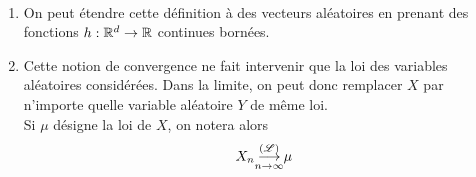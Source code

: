 \begin{remark}\,
    \begin{enumerate}
        \item On peut étendre cette définition à des vecteurs aléatoires
        en prenant des fonctions \(h:\mathbb{R}^d\to\mathbb{R}\) continues bornées.

        \item Cette notion de convergence ne fait intervenir que la loi
        des variables aléatoires considérées. Dans la limite, on peut donc
        remplacer \(X\) par n'importe quelle variable aléatoire \(Y\) de
        même loi.\\
        Si \(\mu\) désigne la loi de \(X\), on notera alors
        \begin{equation*}
            X_n \underset{n\to\infty}{{\overset{(\mathscr{L})}{\longrightarrow}}} \mu
        \end{equation*}
    \end{enumerate}
\end{remark}


